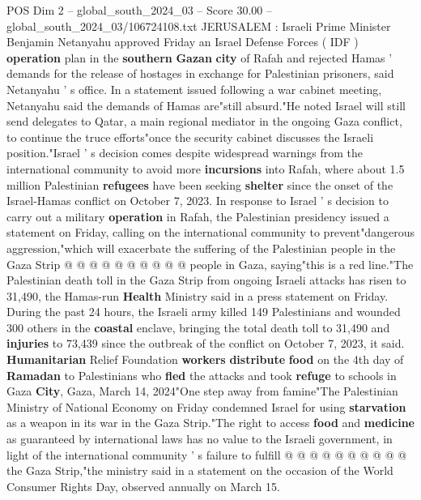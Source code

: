 \begin{textsample}{POS Dim 2 – global\_south\_2024\_03 – Score 30.00 – global\_south\_2024\_03/106724108.txt}  \label{ex:f2_pos_001}
JERUSALEM : Israeli Prime Minister Benjamin Netanyahu approved Friday an Israel Defense Forces ( IDF ) \textbf{operation} plan in the \textbf{southern} \textbf{Gazan} \textbf{city} of Rafah and rejected Hamas ' demands for the release of hostages in exchange for Palestinian prisoners, said Netanyahu ' s office.
In a statement issued following a war cabinet meeting, Netanyahu said the demands of Hamas are"still absurd."He noted Israel will still send delegates to Qatar, a main regional mediator in the ongoing Gaza conflict, to continue the truce efforts"once the security cabinet discusses the Israeli position."Israel ' s decision comes despite widespread warnings from the international community to avoid more \textbf{incursions} into Rafah, where about 1.5 million Palestinian \textbf{refugees} have been seeking \textbf{shelter} since the onset of the Israel-Hamas conflict on October 7, 2023.
In response to Israel ' s decision to carry out a military \textbf{operation} in Rafah, the Palestinian presidency issued a statement on Friday, calling on the international community to prevent"dangerous aggression,"which will exacerbate the suffering of the Palestinian people in the Gaza Strip @ @ @ @ @ @ @ @ @ @ people in Gaza, saying"this is a red line."The Palestinian death toll in the Gaza Strip from ongoing Israeli attacks has risen to 31,490, the Hamas-run \textbf{Health} Ministry said in a press statement on Friday.
During the past 24 hours, the Israeli army killed 149 Palestinians and wounded 300 others in the \textbf{coastal} enclave, bringing the total death toll to 31,490 and \textbf{injuries} to 73,439 since the outbreak of the conflict on October 7, 2023, it said. \textbf{Humanitarian} Relief Foundation \textbf{workers} \textbf{distribute} \textbf{food} on the 4th day of \textbf{Ramadan} to Palestinians who \textbf{fled} the attacks and took \textbf{refuge} to schools in Gaza \textbf{City}, Gaza, March 14, 2024"One step away from famine"The Palestinian Ministry of National Economy on Friday condemned Israel for using \textbf{starvation} as a weapon in its war in the Gaza Strip."The right to access \textbf{food} and \textbf{medicine} as guaranteed by international laws has no value to the Israeli government, in light of the international community ' s failure to fulfill @ @ @ @ @ @ @ @ @ @ the Gaza Strip,"the ministry said in a statement on the occasion of the World Consumer Rights Day, observed annually on March 15.

\end{textsample}

